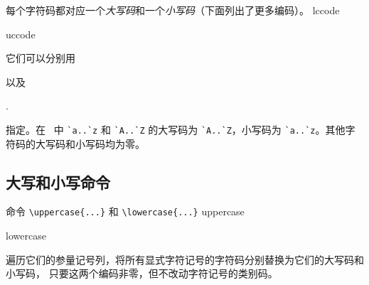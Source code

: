 \documentclass{book}
\begin{document}
每个字符码都对应一个\emph{大写码}和一个\emph{小写码}（下面列出了更多编码）。%
\cstoidx lccode\par\cstoidx uccode\par
{}%
%
它们可以分别用
\begin{Disp}\end{Disp}
以及
\begin{Disp}.\end{Disp}
指定。在 \IniTeX\ 中 \verb-`a..`z- 和 \verb-`A..`Z- 的大写码为
\label{ini:uclc}
\verb-`A..`Z-，小写码为 \verb-`a..`z-。其他字符码的大写码和小写码均为零。

\subsection{大写和小写命令}
\label{upcase}

命令 \verb-\uppercase{...}- 和 \verb-\lowercase{...}-
\cstoidx uppercase\par\cstoidx lowercase\par
遍历它们的参量记号列，将所有显式字符记号的字符码分别替换为它们的大写码和小写码，
只要这两个编码非零，但不改动字符记号的类别码。
\end{document}
